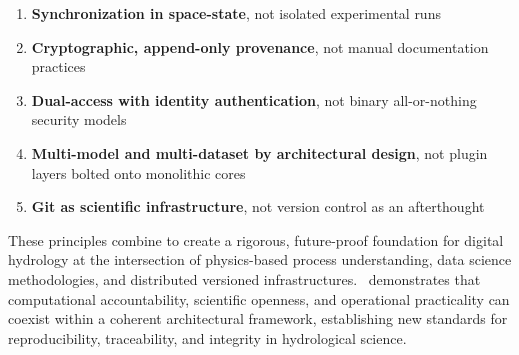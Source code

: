 \begin{enumerate}
\item \textbf{Synchronization in space-state}, not isolated experimental runs
\item \textbf{Cryptographic, append-only provenance}, not manual documentation practices
\item \textbf{Dual-access with identity authentication}, not binary all-or-nothing security models
\item \textbf{Multi-model and multi-dataset by architectural design}, not plugin layers bolted onto monolithic cores
\item \textbf{Git as scientific infrastructure}, not version control as an afterthought
\end{enumerate}

These principles combine to create a rigorous, future-proof foundation for digital hydrology at the intersection of physics-based process understanding, data science methodologies, and distributed versioned infrastructures. \hydrot\ demonstrates that computational accountability, scientific openness, and operational practicality can coexist within a coherent architectural framework, establishing new standards for reproducibility, traceability, and integrity in hydrological science.

\newpage
